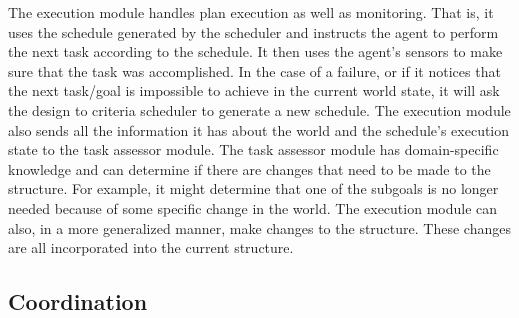 The execution module handles plan execution as well as monitoring.
That is, it uses the schedule generated by the scheduler and instructs
the agent to perform the next task according to the schedule. It then
uses the agent's sensors to make sure that the task was accomplished.
In the case of a failure, or if it notices that the next task/goal is
impossible to achieve in the current world state, it will ask the
design to criteria scheduler to generate a new schedule. The execution
module also sends all the information it has about the world and the
schedule's execution state to the task assessor module. The task
assessor module has domain-specific knowledge and can determine if
there are changes that need to be made to the \taems{} structure. For
example, it might determine that one of the subgoals is no longer
needed because of some specific change in the world. The execution
module can also, in a more generalized manner, make changes to the
\taems{} structure. These changes are all incorporated into the
current \taems{} structure.

\subsection{Coordination}


